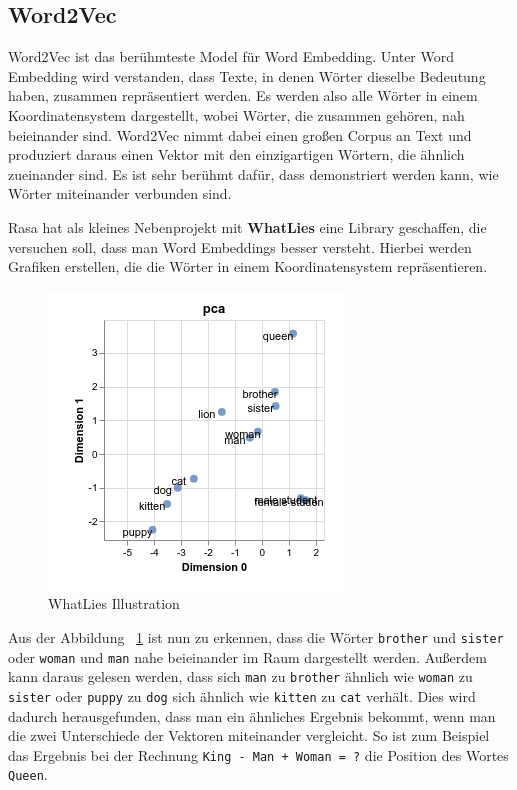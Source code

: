 \subsection{Word2Vec}\label{subsec:word2vec}

Word2Vec ist das berühmteste Model für Word Embedding.
Unter Word Embedding wird verstanden, dass Texte, in denen Wörter dieselbe Bedeutung haben, zusammen repräsentiert werden.
Es werden also alle Wörter in einem Koordinatensystem dargestellt, wobei Wörter, die zusammen gehören, nah beieinander sind.
Word2Vec nimmt dabei einen großen Corpus an Text und produziert daraus einen Vektor mit den einzigartigen Wörtern, die ähnlich zueinander sind.
Es ist sehr berühmt dafür, dass demonstriert werden kann, wie Wörter miteinander verbunden sind.

Rasa hat als kleines Nebenprojekt mit \textbf{WhatLies} eine Library geschaffen, die versuchen soll, dass man Word Embeddings besser versteht.
Hierbei werden Grafiken erstellen, die die Wörter in einem Koordinatensystem repräsentieren.\cite{whatlies}

\begin{figure}[hbt!]
    \centering
    \includegraphics[scale=1]{pics/whatlies_demo}
    \caption{WhatLies Illustration~\cite{whatlies}}
    \label{fig:whatlies-demo}
\end{figure}

Aus der Abbildung ~\ref{fig:whatlies-demo} ist nun zu erkennen, dass die Wörter \texttt{brother} und \texttt{sister} oder \texttt{woman} und \texttt{man} nahe beieinander im Raum dargestellt werden.
Außerdem kann daraus gelesen werden, dass sich \texttt{man} zu \texttt{brother} ähnlich wie \texttt{woman} zu \texttt{sister} oder \texttt{puppy} zu \texttt{dog} sich ähnlich wie \texttt{kitten} zu \texttt{cat} verhält.
Dies wird dadurch herausgefunden, dass man ein ähnliches Ergebnis bekommt, wenn man die zwei Unterschiede der Vektoren miteinander vergleicht.
So ist zum Beispiel das Ergebnis bei der Rechnung \texttt{King - Man + Woman = ?} die Position des Wortes \texttt{Queen}.


